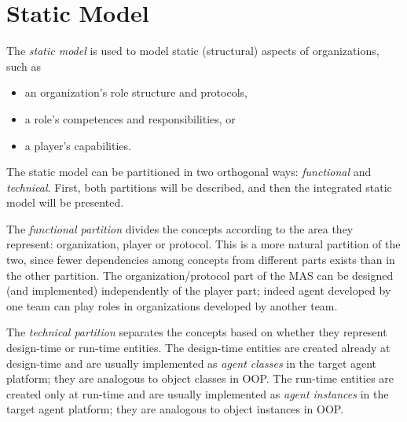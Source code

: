 
\section{Static Model}

The \textit{static model} is used to model static (structural) aspects of organizations, such as
\begin{itemize}
	\item an organization's role structure and protocols,
	\item a role's competences and responsibilities, or
	\item a player's capabilities.
\end{itemize}

The static model can be partitioned in two orthogonal ways: \textit{functional} and \textit{technical}.
First, both partitions will be described, and then the integrated static model will be presented.

The \textit{functional partition} divides the concepts according to the area they represent: organization, player or protocol.
This is a more natural partition of the two, since fewer dependencies among concepts from different parts exists than in the other partition.
The organization/protocol part of the MAS can be designed (and implemented) independently of the player part; indeed agent developed by one team can play roles in organizations developed by another team.

The \textit{technical partition} separates the concepts based on whether they represent design-time or run-time entities.
The design-time entities are created already at design-time and are usually implemented as \textit{agent classes} in the target agent platform; they are analogous to object classes in OOP.
The run-time entities are created only at run-time and are usually implemented as \textit{agent instances} in the target agent platform; they are analogous to object instances in OOP.

